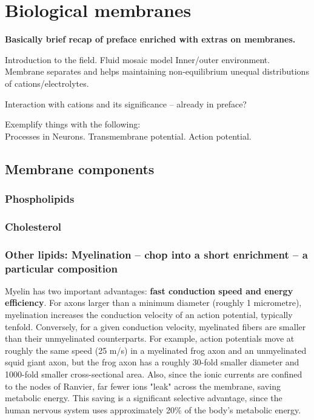 \chapter{Biological membranes}
\label{chap:intro}

 \textbf{Basically brief recap of preface enriched with extras on membranes.}

 Introduction to the field. 
 Fluid mosaic model \citep{vereb03}
 Inner/outer environment. 
 Membrane separates and helps maintaining non-equilibrium unequal distributions of cations/electrolytes. 

 Interaction with cations and its significance -- already in preface?

 Exemplify things with the following: \\
 Processes in Neurons. 
 Transmembrane potential. 
 Action potential. 

\section{Membrane components}

\subsection{Phospholipids}

\subsection{Cholesterol}

\subsection{Other lipids: Myelination -- chop into a short enrichment -- a particular composition}
Myelin has two important advantages:\textbf{ fast conduction speed and energy efficiency}. For axons larger than a minimum diameter (roughly 1 micrometre), myelination increases the conduction velocity of an action potential, typically tenfold. Conversely, for a given conduction velocity, myelinated fibers are smaller than their unmyelinated counterparts. For example, action potentials move at roughly the same speed (25 m/s) in a myelinated frog axon and an unmyelinated squid giant axon, but the frog axon has a roughly 30-fold smaller diameter and 1000-fold smaller cross-sectional area. Also, since the ionic currents are confined to the nodes of Ranvier, far fewer ions "leak" across the membrane, saving metabolic energy. This saving is a significant selective advantage, since the human nervous system uses approximately 20\% of the body's metabolic energy.

